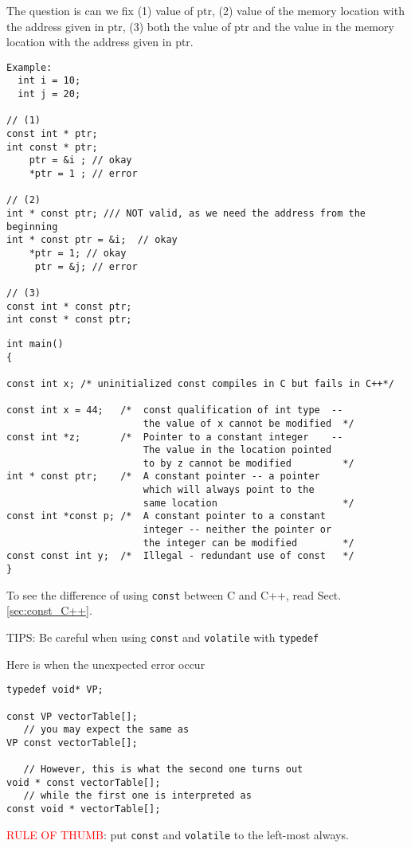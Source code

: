 The question is can we fix (1) value of ptr, (2) value of the memory location
with the address given in ptr, (3) both the value of ptr and the value in the
memory location with the address given in ptr. 
\begin{verbatim}
Example:
  int i = 10;
  int j = 20;
  
// (1)
const int * ptr;
int const * ptr;
    ptr = &i ; // okay
    *ptr = 1 ; // error 

// (2)
int * const ptr; /// NOT valid, as we need the address from the beginning
int * const ptr = &i;  // okay
    *ptr = 1; // okay
     ptr = &j; // error
     
// (3)
const int * const ptr;
int const * const ptr;
\end{verbatim}


\begin{verbatim}
int main()
{

const int x; /* uninitialized const compiles in C but fails in C++*/
   
const int x = 44;   /*  const qualification of int type  --
                        the value of x cannot be modified  */
const int *z;       /*  Pointer to a constant integer    --
                        The value in the location pointed
                        to by z cannot be modified         */
int * const ptr;    /*  A constant pointer -- a pointer
                        which will always point to the
                        same location                      */
const int *const p; /*  A constant pointer to a constant
                        integer -- neither the pointer or
                        the integer can be modified        */
const const int y;  /*  Illegal - redundant use of const   */   
}
\end{verbatim}

To see the difference of using \verb!const! between C and C++, read
Sect.\ref{sec:const_C++}.

\begin{mdframed}
TIPS: Be careful when using \verb!const! and \verb!volatile! with \verb!typedef!

Here is when the unexpected error occur
\begin{verbatim}
typedef void* VP;

const VP vectorTable[];
   // you may expect the same as
VP const vectorTable[];

   // However, this is what the second one turns out
void * const vectorTable[];
   // while the first one is interpreted as
const void * vectorTable[];      
\end{verbatim}

\textcolor{red}{RULE OF THUMB}: put \verb!const! and \verb!volatile! to the
left-most always.
\end{mdframed}

